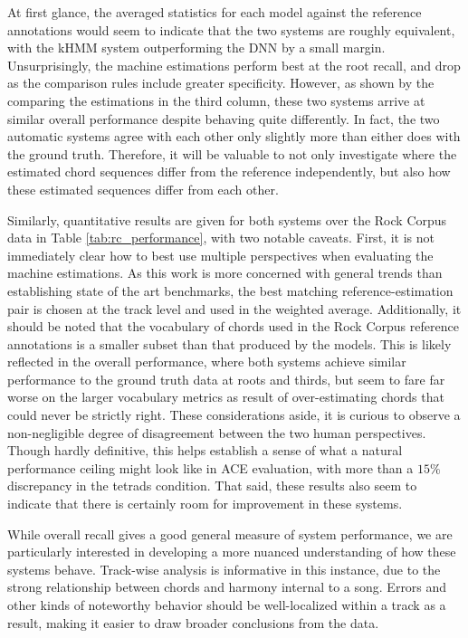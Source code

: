 \documentclass{article}
\begin{document}
At first glance, the averaged statistics for each model against the reference annotations would seem to indicate that the two systems are roughly equivalent, with the kHMM system outperforming the DNN by a small margin.
Unsurprisingly, the machine estimations perform best at the root recall, and drop as the comparison rules include greater specificity.
However, as shown by the comparing the estimations in the third column, these two systems arrive at similar overall performance despite behaving quite differently.
In fact, the two automatic systems agree with each other only slightly more than either does with the ground truth.
Therefore, it will be valuable to not only investigate where the estimated chord sequences differ from the reference independently, but also how these estimated sequences differ from each other.


Similarly, quantitative results are given for both systems over the Rock Corpus data in Table \ref{tab:rc_performance}, with two notable caveats.
First, it is not immediately clear how to best use multiple perspectives when evaluating the machine estimations.
As this work is more concerned with general trends than establishing state of the art benchmarks, the best matching reference-estimation pair is chosen at the track level and used in the weighted average.
Additionally, it should be noted that the vocabulary of chords used in the Rock Corpus reference annotations is a smaller subset than that produced by the models.
This is likely reflected in the overall performance, where both systems achieve similar performance to the ground truth data at roots and thirds, but seem to fare far worse on the larger vocabulary metrics as result of over-estimating chords that could never be strictly right.
These considerations aside, it is curious to observe a non-negligible degree of disagreement between the two human perspectives.
Though hardly definitive, this helps establish a sense of what a natural performance ceiling might look like in ACE evaluation, with more than a $15\%$discrepancy in the tetrads condition.
That said, these results also seem to indicate that there is certainly room for improvement in these systems.

While overall recall gives a good general measure of system performance, we are particularly interested in developing a more nuanced understanding of how these systems behave.
Track-wise analysis is informative in this instance, due to the strong relationship between chords and harmony internal to a song.
Errors and other kinds of noteworthy behavior should be well-localized within a track as a result, making it easier to draw broader conclusions from the data.
\end{document}
